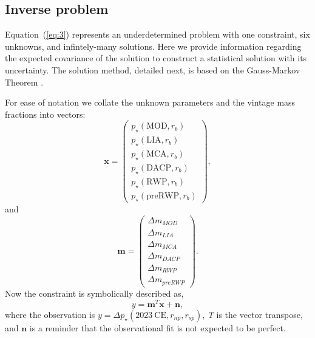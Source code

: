 \documentclass[12pt]{article}
\begin{document}
\subsection{Inverse problem}

Equation~(\ref{eq:3}) represents an underdetermined problem with one
constraint, six unknowns, and infintely-many solutions. Here we
provide information regarding the expected covariance of the solution
to construct a statistical solution with its uncertainty. The solution
method, detailed next, is based on the Gauss-Markov Theorem
\cite{Wunsch-2006:Discrete}.

For ease of notation we collate the unknown parameters and the vintage mass fractions into vectors:
\begin{equation}
  \mathbf{x} = \left(\begin{array}{c}  p_{\star}(\mathrm{MOD}, r_{b}) \\
                          p_{\star}(\mathrm{LIA}, r_{b}) \\
                          p_{\star}(\mathrm{MCA}, r_{b}) \\
                          p_{\star}(\mathrm{DACP}, r_{b}) \\
                          p_{\star}(\mathrm{RWP}, r_{b}) \\
                          p_{\star}(\mathrm{preRWP}, r_{b}) 
                        \end{array} \right),
                      \end{equation}
                      and
                      \begin{equation}
                        \mathbf{m} = \left(\begin{array}{c}  {\Delta}m_{MOD} \\
{\Delta}m_{LIA} \\
{\Delta}m_{MCA} \\
{\Delta}m_{DACP} \\
{\Delta}m_{RWP} \\
{\Delta}m_{preRWP} 
 \end{array} \right) .
\end{equation}
Now the constraint is symbolically described as,
\begin{equation}
\label{eq:4}
y = \mathbf{m}^{T}\mathbf{x} + \mathbf{n},
\end{equation}
where the observation is $y={\Delta}p_{\star}(2023~ \mathrm{CE}, r_{np}, r_{sp})$, \textit{T} is the vector transpose, and $\mathbf{n}$ is a reminder that the observational fit is not expected to be perfect.
\end{document}
